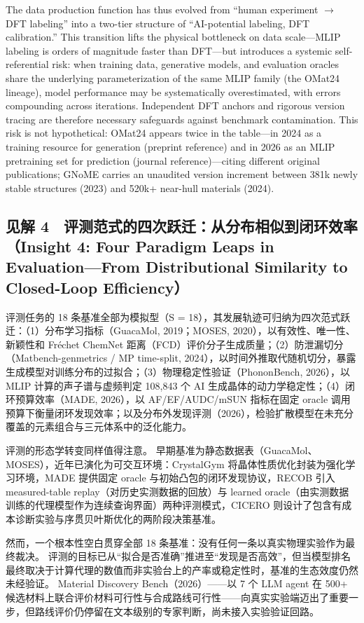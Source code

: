 \documentclass[11pt,a4paper]{ctexart}
\begin{document}
The data production function has thus evolved from ``human experiment $\to$ DFT labeling'' into a two-tier structure of ``AI-potential labeling, DFT calibration.'' This transition lifts the physical bottleneck on data scale---MLIP labeling is orders of magnitude faster than DFT---but introduces a systemic self-referential risk: when training data, generative models, and evaluation oracles share the underlying parameterization of the same MLIP family (the OMat24 lineage), model performance may be systematically overestimated, with errors compounding across iterations. Independent DFT anchors and rigorous version tracing are therefore necessary safeguards against benchmark contamination. This risk is not hypothetical: OMat24 appears twice in the table---in 2024 as a training resource for generation (preprint reference) and in 2026 as an MLIP pretraining set for prediction (journal reference)---citing different original publications; GNoME carries an unaudited version increment between 381k newly stable structures (2023) and 520k+ near-hull materials (2024).

\subsection*{见解 4　评测范式的四次跃迁：从分布相似到闭环效率（Insight 4: Four Paradigm Leaps in Evaluation---From Distributional Similarity to Closed-Loop Efficiency）}

评测任务的 18 条基准全部为模拟型（S = 18），其发展轨迹可归纳为四次范式跃迁：（1）分布学习指标（GuacaMol, 2019；MOSES, 2020），以有效性、唯一性、新颖性和 Fr\'echet ChemNet 距离（FCD）评价分子生成质量；（2）防泄漏切分（Matbench-genmetrics / MP time-split, 2024），以时间外推取代随机切分，暴露生成模型对训练分布的过拟合；（3）物理稳定性验证（PhononBench, 2026），以 MLIP 计算的声子谱与虚频判定 108,843 个 AI 生成晶体的动力学稳定性；（4）闭环预算效率（MADE, 2026），以 AF/EF/AUDC/mSUN 指标在固定 oracle 调用预算下衡量闭环发现效率；以及分布外发现评测（2026），检验扩散模型在未充分覆盖的元素组合与三元体系中的泛化能力。

评测的形态学转变同样值得注意。
早期基准为静态数据表（GuacaMol、MOSES），近年已演化为可交互环境：CrystalGym 将晶体性质优化封装为强化学习环境，MADE 提供固定 oracle 与初始凸包的闭环发现协议，RECOB 引入 measured-table replay（对历史实测数据的回放）与 learned oracle（由实测数据训练的代理模型作为连续查询界面）两种评测模式，CICERO 则设计了包含有成本诊断实验与序贯贝叶斯优化的两阶段决策基准。

然而，一个根本性空白贯穿全部 18 条基准：没有任何一条以真实物理实验作为最终裁决。
评测的目标已从``拟合是否准确''推进至``发现是否高效''，但当模型排名最终取决于计算代理的数值而非实验台上的产率或稳定性时，基准的生态效度仍然未经验证。
Material Discovery Bench（2026）——以 7 个 LLM agent 在 500+ 候选材料上联合评价材料可行性与合成路线可行性——向真实实验端迈出了重要一步，但路线评价仍停留在文本级别的专家判断，尚未接入实验验证回路。
\end{document}
